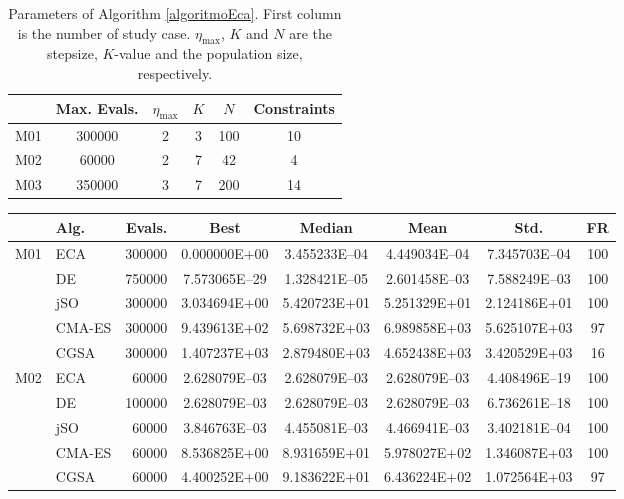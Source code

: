 \documentclass[12pt,letterpape]{article}
\begin{document}
\begin{table}[!ht]
	\centering
	\begin{tabular}{cccccc}
		    & Max. Evals. & $\eta_{\max}$ & $K$ & $N$ & Constraints \\ \hline
		M01 &   300000    &     2         &  3  & 100 & 10\\
		M02 &    60000    &     2         &  7  & 42  & 4 \\
		M03 &   350000    &     3         &  7  & 200 & 14\\
	\end{tabular}
	\caption{Parameters of Algorithm \ref{algoritmoEca}. First column is the number
	of study case. $\eta_{\max}$, $K$ and $N$ are the stepsize, $K$-value and the
	population size, respectively.}
	\label{tab:parms}
\end{table}
% 
% 
\begin{table}[!ht]
	\centering
	\begin{tabular}{clrccccc}
		\hline
		 & {\bf Alg.} & {\bf Evals}.  & {\bf Best} & {\bf Median} & {\bf Mean} & {\bf Std.} & \textbf{FR} \\ \hline
		\multirow{5}{*}{M01}
		& ECA & 300000  & 0.000000E+00  & 3.455233E--04 & 4.449034E--04 & 7.345703E--04 & 100\\  
		& DE  & 750000  & 7.573065E--29 & 1.328421E--05 & 2.601458E--03 & 7.588249E--03 & 100 \\
        & jSO & 300000  & 3.034694E+00  & 5.420723E+01  & 5.251329E+01  & 2.124186E+01  & 100 \\
        & CMA-ES&300000 & 9.439613E+02  & 5.698732E+03  & 6.989858E+03  & 5.625107E+03  & 97 \\
        & CGSA& 300000  & 1.407237E+03  & 2.879480E+03  & 4.652438E+03  & 3.420529E+03  & 16 \\ \hline
		\multirow{5}{*}{M02}
		& ECA &  60000  & 2.628079E--03 & 2.628079E--03 & 2.628079E--03 & 4.408496E--19 & 100\\ 
		& DE  & 100000  & 2.628079E--03 & 2.628079E--03 & 2.628079E--03 & 6.736261E--18 & 100\\
        & jSO &  60000  & 3.846763E--03 & 4.455081E--03 & 4.466941E--03 & 3.402181E--04 & 100\\
        & CMA-ES& 60000 & 8.536825E+00  & 8.931659E+01  & 5.978027E+02  & 1.346087E+03  & 100\\
        & CGSA&  60000  & 4.400252E+00  & 9.183622E+01  & 6.436224E+02  & 1.072564E+03  & 97 \\ \hline

\end{tabular}
\end{table}
\end{document}

